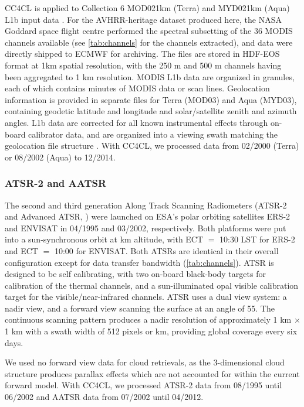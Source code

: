 CC4CL is applied to Collection 6 MOD021km (Terra) and MYD021km (Aqua) L1b input data \citep{MODIS_L1B}. For the AVHRR-heritage dataset produced here, the NASA Goddard space flight centre performed the spectral subsetting of the 36 MODIS channels available (see \autoref{tab:channels} for the channels extracted), and data were directly shipped to ECMWF for archiving. The files are stored in HDF-EOS format at 1km spatial resolution, with the 250 m and 500 m channels having been aggregated to 1 km resolution. MODIS L1b data are organized in granules, each of which contains  minutes of MODIS data or  scan lines. Geolocation information is provided in separate files for Terra (MOD03) and Aqua (MYD03), containing geodetic latitude and longitude and solar/satellite zenith and azimuth angles. L1b data are corrected for all known instrumental effects through on-board calibrator data, and are organized into a viewing swath matching the geolocation file structure \citep{MODIS_PUG}. With CC4CL, we processed data from 02/2000 (Terra) or 08/2002 (Aqua) to 12/2014. 

\subsubsection{ATSR-2 and AATSR}

The second and third generation Along Track Scanning Radiometers (ATSR-2 and Advanced ATSR, \citet{Merchant12}) were launched on ESA's polar orbiting satellites ERS-2 and ENVISAT in 04/1995 and 03/2002, respectively. Both platforms were put into a sun-synchronous orbit at  km altitude, with ECT $=$ 10:30 LST for ERS-2 and ECT $=$ 10:00 for ENVISAT. Both ATSRs are identical in their overall configuration except for data transfer bandwidth (\autoref{tab:channels}). ATSR is designed to be self calibrating, with two on-board black-body targets for calibration of the thermal channels, and a sun-illuminated opal visible calibration target for the visible/near-infrared channels. ATSR uses a dual view system: a nadir view, and a forward view scanning the surface at an angle of 55\textdegree. The continuous scanning pattern produces a nadir resolution of approximately 1 km $\times$ 1 km with a swath width of 512 pixels or  km, providing global coverage every six days. 

We used no forward view data for cloud retrievals, as the 3-dimensional cloud structure produces parallax effects which are not accounted for within the current forward model. With CC4CL, we processed ATSR-2 data from 08/1995 until 06/2002 and AATSR data from 07/2002 until 04/2012. 

